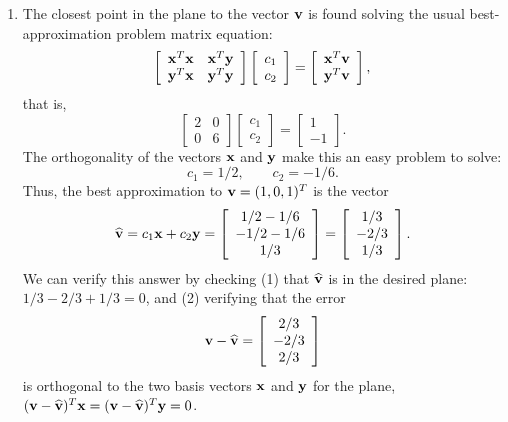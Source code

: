{\begin{solution}
\begin{enumerate}
\item  The closest point in the plane to the vector ${\bf v}$ is found solving
       the usual best-approximation problem matrix equation:
       \[  \left[\begin{array}{cc} {\bf x}^T{\bf x} & {\bf x}^T {\bf y} \\ {\bf y}^T{\bf x} & {\bf y}^T{\bf y}
       \end{array}\right] 
         \left[\begin{array}{c}c_1\\ c_2\end{array}\right]
        = \left[\begin{array}{c} {\bf x}^T{\bf v} \\ {\bf y}^T {\bf v} \end{array}\right],\]
       that is, 
       \[  \left[\begin{array}{cc} 2 & 0 \\ 0 & 6\end{array}\right] 
\left[\begin{array}{c}c_1\\ c_2\end{array}\right]
        = \left[\begin{array}{c} 1 \\ -1\end{array}\right].
        \]
       The orthogonality of the vectors ${\bf x}$ and ${\bf y}$ make this an easy problem to solve:
        \[ c_1 = 1/2, \qquad c_2 = -1/6.\]
       Thus, the best approximation to ${\bf v} = (1, 0, 1)^T$ is the vector
         \[ 
\widehat{{\bf v}} = c_1 {\bf x} + c_2 {\bf y} = \left[\begin{array}{c}1/2-1/6 \\ -1/2-1/6 \\ 1/3\end{array}\right] 
                                      = \left[\begin{array}{c} 1/3 \\ -2/3 \\ 1/3\end{array}\right].
                                      \]
       We can verify this answer by checking 
       (1) that $\widehat{{\bf v}}$ is in the desired plane: $1/3-2/3+1/3 = 0$, 
        and (2) verifying that the error 
            \[ {\bf v} - \widehat{{\bf v}} = \left[\begin{array}{c}2/3 \\ -2/3 \\ 2/3\end{array}\right]\]
        is orthogonal to the two basis vectors ${\bf x}$ and ${\bf y}$ for the plane,
        $({\bf v}-\widehat{{\bf v}})^T{\bf x} = ({\bf v}-\widehat{{\bf v}})^T{\bf y} = 0$.
 \end{enumerate}

\end{solution}}{}

